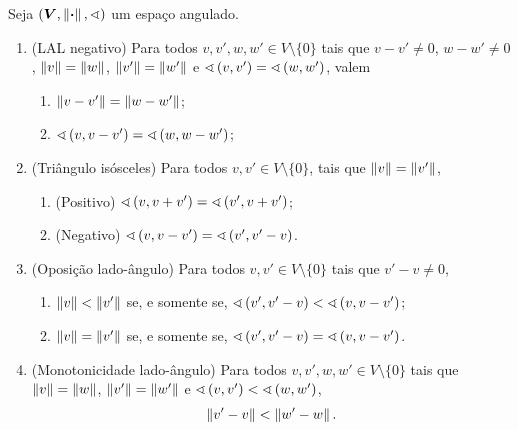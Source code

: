 \begin{proposition}
Seja $(\bm V, \nor{\var},\angf)$ um espaço angulado.
	\begin{enumerate}
		\item (LAL negativo) Para todos $v,v',w,w' \in V \setminus \{0\}$ tais que $v-v' \neq 0$, $w-w' \neq 0$, $\nor{v}=\nor{w}$, $\nor{v'}=\nor{w'}$ e $\ang{v}{v'}=\ang{w}{w'}$, valem
			\begin{enumerate}
			\item $\nor{v-v'}=\nor{w-w'}$;
			\item $\ang{v}{v-v'}=\ang{w}{w-w'}$;
			\end{enumerate}
		\item (Triângulo isósceles) Para todos $v,v' \in V \setminus \{0\}$, tais que $\nor{v}=\nor{v'}$,
			\begin{enumerate}
			\item (Positivo) $\ang{v}{v+v'} = \ang{v'}{v+v'}$;
			\item (Negativo) $\ang{v}{v-v'} = \ang{v'}{v'-v}$.
			\end{enumerate}

		\item (Oposição lado-ângulo) Para todos $v,v' \in V \setminus \{0\}$ tais que $v'-v \neq 0$,
			\begin{enumerate}
			\item $\nor{v}<\nor{v'}$ se, e somente se, $\ang{v'}{v'-v} < \ang{v}{v-v'}$;
			\item $\nor{v}=\nor{v'}$ se, e somente se, $\ang{v'}{v'-v} = \ang{v}{v-v'}$.
			\end{enumerate}

		\item (Monotonicidade lado-ângulo) Para todos $v,v',w,w' \in V \setminus \{0\}$ tais que $\nor{v}=\nor{w}$, $\nor{v'}=\nor{w'}$ e $\ang{v}{v'} < \ang{w}{w'}$,
			\begin{equation*}
			\nor{v'-v} < \nor{w'-w}.
			\end{equation*}
	\end{enumerate}
\end{proposition}
